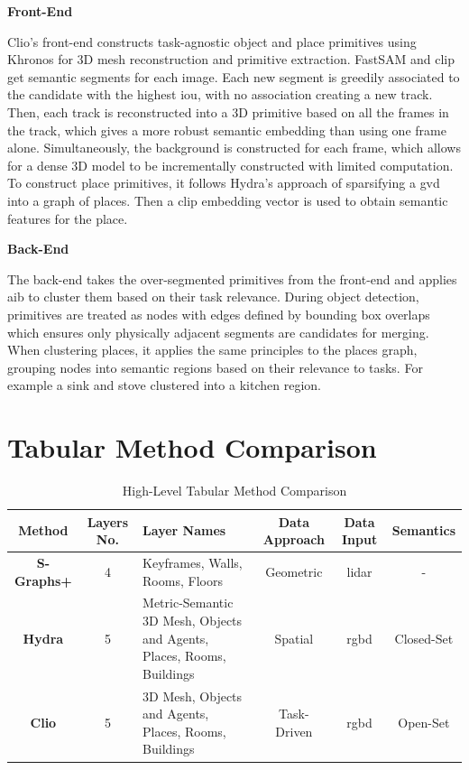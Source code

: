 \noindent \textbf{Front-End}

Clio’s front-end constructs task-agnostic object and place primitives using Khronos \cite{schmid2024khronosunifiedapproachspatiotemporal} for 3D mesh reconstruction and primitive extraction. FastSAM and \gls{clip} get semantic segments for each image. Each new segment is greedily associated to the candidate with the highest \gls{iou}, with no association creating a new track. Then, each track is reconstructed into a 3D primitive based on all the frames in the track, which gives a more robust semantic embedding than using one frame alone. Simultaneously, the background is constructed for each frame, which allows for a dense 3D model to be incrementally constructed with limited computation. To construct place primitives, it follows Hydra’s approach of sparsifying a \gls{gvd} into a graph of places. Then a \gls{clip} embedding vector is used to obtain semantic features for the place.

\noindent \textbf{Back-End}

The back-end takes the over-segmented primitives from the front-end and applies \gls{aib} to cluster them based on their task relevance. During object detection, primitives are treated as nodes with edges defined by bounding box overlaps which ensures only physically adjacent segments are candidates for merging. When clustering places, it applies the same principles to the places graph, grouping nodes into semantic regions based on their relevance to tasks. For example a sink and stove clustered into a kitchen region.


\section{Tabular Method Comparison}\label{sec:method-comparison}

\begin{table}[H]
\centering
\caption{High-Level Tabular Method Comparison}
\begin{tabular}{c c p{3.5cm} c c c} %
\toprule
\textbf{Method} & \textbf{Layers No.} & \textbf{Layer Names} & \textbf{Data Approach} & \textbf{Data Input} & \textbf{Semantics} \\ 
\midrule
\textbf{S-Graphs+}   & 4          & Keyframes, Walls, Rooms, Floors          & Geometric & \acrshort{lidar} & -         \\
\textbf{Hydra}   & 5       & Metric-Semantic 3D Mesh, Objects and Agents, Places, Rooms, Buildings & Spatial & \acrshort{rgbd} & Closed-Set        \\
\textbf{Clio}   & 5       & 3D Mesh, Objects and Agents, Places, Rooms, Buildings  & Task-Driven & \acrshort{rgbd} & Open-Set        \\
\bottomrule
\end{tabular}
\end{table}

